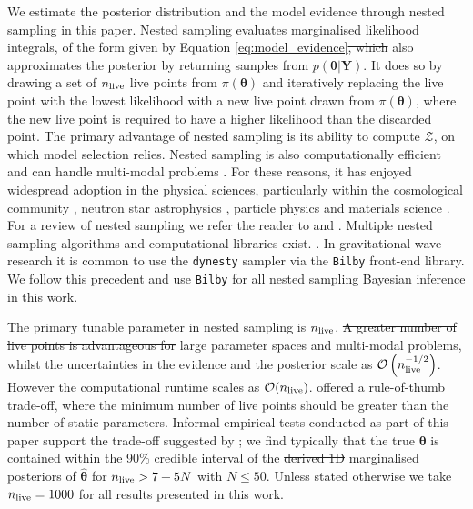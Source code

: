 \documentclass[fleqn,usenatbib,useAMS]{mnras}
\providecommand{\DIFadd}[1]{{\protect\color{blue}\uwave{#1}}} %
\providecommand{\DIFdel}[1]{{\protect\color{red}\sout{#1}}}                      %
\providecommand{\DIFaddbegin}{} %
\providecommand{\DIFaddend}{} %
\providecommand{\DIFdelbegin}{} %
\providecommand{\DIFdelend}{} %
\newcommand{\DIFscaledelfig}{0.5}
\newlength{\DIFdelgraphicswidth} %
\newlength{\DIFdelgraphicsheight} %
\newcommand{\DIFaddincludegraphics}[2][]{{\color{blue}\fbox{\DIFOincludegraphics[#1]{#2}}}} %
\newcommand{\DIFdelincludegraphics}[2][]{%
\sbox{\DIFdelgraphicsbox}{\DIFOincludegraphics[#1]{#2}}%
\settoboxwidth{\DIFdelgraphicswidth}{\DIFdelgraphicsbox} %
\settoboxtotalheight{\DIFdelgraphicsheight}{\DIFdelgraphicsbox} %
\scalebox{\DIFscaledelfig}{%
\parbox[b]{\DIFdelgraphicswidth}{\usebox{\DIFdelgraphicsbox}\\[-\baselineskip] \rule{\DIFdelgraphicswidth}{0em}}\llap{\resizebox{\DIFdelgraphicswidth}{\DIFdelgraphicsheight}{%
\setlength{\unitlength}{\DIFdelgraphicswidth}%
\begin{picture}(1,1)%
\thicklines\linethickness{2pt} %
{\color[rgb]{1,0,0}\put(0,0){\framebox(1,1){}}}%
{\color[rgb]{1,0,0}\put(0,0){\line( 1,1){1}}}%
{\color[rgb]{1,0,0}\put(0,1){\line(1,-1){1}}}%
\end{picture}%
}\hspace*{3pt}}} %
} %
\DeclareRobustCommand{\DIFaddbegin}{\DIFOaddbegin \let\includegraphics\DIFaddincludegraphics} %
\DeclareRobustCommand{\DIFaddend}{\DIFOaddend \let\includegraphics\DIFOincludegraphics} %
\DeclareRobustCommand{\DIFdelbegin}{\DIFOdelbegin \let\includegraphics\DIFdelincludegraphics} %
\DeclareRobustCommand{\DIFdelend}{\DIFOaddend \let\includegraphics\DIFOincludegraphics} %
\begin{document}
 We estimate the posterior distribution and the model evidence through nested sampling \citep{Skilling} in this paper. Nested sampling evaluates marginalised likelihood integrals, of the form given by Equation \eqref{eq:model_evidence}\DIFdelbegin \DIFdel{, which }\DIFdelend \DIFaddbegin \DIFadd{. It }\DIFaddend also approximates the posterior by returning samples from $p(\boldsymbol{\theta} | \boldsymbol{Y})$. It does so by drawing a set of $n_{\rm live}$ live points from $\pi(\boldsymbol{\theta})$ and iteratively replacing the live point with the lowest likelihood with a new live point drawn from $\pi(\boldsymbol{\theta})$, where the new live point is required to have a higher likelihood than the discarded point. The primary advantage of nested sampling is its ability to compute $\mathcal{Z}$, on which model selection relies. Nested sampling is also computationally efficient and can handle multi-modal problems \citep{Ashton2022}. For these reasons, it has enjoyed widespread adoption in the physical sciences, particularly within the cosmological community \citep{Mukherjee2006,Feroz2008,Handley2015}, neutron star astrophysics \citep{Myers2021MNRAS.502.3113M,Meyers2021,Melatos2023}, particle physics \citep{proceedings2019033014} and materials science \citep{2009arXiv0906materials}. For a review of nested sampling we refer the reader to \cite{Buchner2021} and \cite{Ashton2022}. Multiple nested sampling algorithms and computational libraries exist. \citep[e.g.][]{Feroz2008,Feroz2009,Handley2015,dynesty2020,UltraNest2021}. In gravitational wave research it is common to use the \texttt{dynesty} sampler \citep{dynesty2020} via the \texttt{Bilby} \citep{bilby.507.2037A} front-end library. We follow this precedent and use \texttt{Bilby} for all nested sampling Bayesian inference in this work. \newline 

The primary tunable parameter in nested sampling is $n_{\rm live}$. \DIFdelbegin \DIFdel{A greater number of live points is advantageous for }\DIFdelend \DIFaddbegin \DIFadd{More live points assists with }\DIFaddend large parameter spaces and multi-modal problems, whilst the uncertainties in the evidence and the posterior scale as $\mathcal{O}\left(n_{\rm live}^{-1/2}\right)$. However the computational runtime scales as $\mathcal{O}(n_{\rm live})$. \cite{Ashton2022} offered a rule-of-thumb trade-off, where the minimum number of live points should be greater than the number of static parameters. Informal empirical tests conducted as part of this paper support the trade-off suggested by \cite{Ashton2022}; we find typically that the true ${\boldsymbol{\theta}}$ is contained within the 90\% credible interval of the \DIFdelbegin \DIFdel{derived 1D }\DIFdelend \DIFaddbegin \DIFadd{one-dimensional }\DIFaddend marginalised posteriors of ${\boldsymbol{\hat{\theta}}}$ for $n_{\rm live} > 7 + 5N$ with $N \leq 50$. Unless stated otherwise we take $n_{\rm live} = 1000$ for all results presented in this work. \newline 
\end{document}
